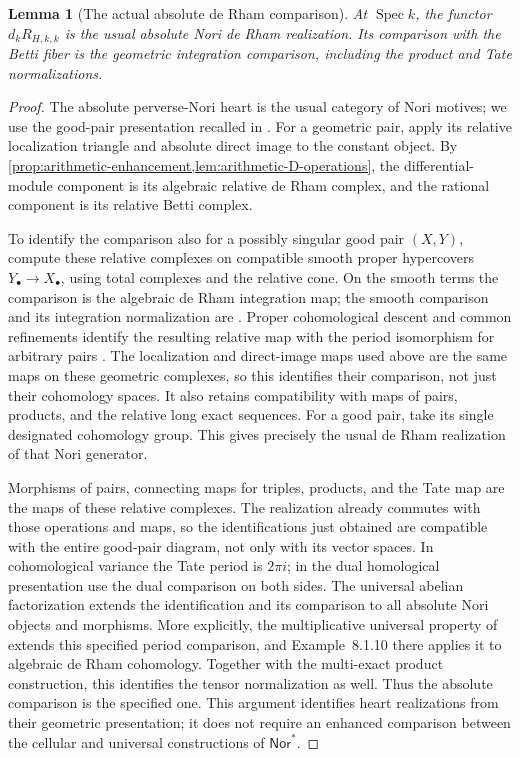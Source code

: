 \documentclass[11pt]{article}
\numberwithin{equation}{section}
\newtheorem{lemma}[lemma]{Lemma}
\theoremstyle{definition}
\theoremstyle{remark}
\newcommand{\Spec}{\operatorname{Spec}}
\begin{document}
\begin{lemma}[The actual absolute de Rham comparison]
\label{lem:absolute-dR-comparison}
At $\Spec k$, the functor $d_kR_{H,k,k}$ is the usual absolute Nori
de Rham realization. Its comparison with the Betti fiber is the
geometric integration comparison, including the product and Tate
normalizations.
\end{lemma}
\begin{proof}
The absolute perverse-Nori heart is the usual category of Nori motives;
we use the good-pair presentation recalled in
\cite[\S1.2]{Tubach}. For a geometric pair, apply its relative
localization triangle and absolute direct image to the constant object.
By \cref{prop:arithmetic-enhancement,lem:arithmetic-D-operations}, the
differential-module component is its algebraic relative de Rham complex,
and the rational component is its relative Betti complex.

To identify the comparison also for a possibly singular good pair
$(X,Y)$, compute these relative complexes on compatible smooth proper
hypercovers $Y_\bullet\to X_\bullet$, using total complexes and the
relative cone. On the smooth terms the comparison is the algebraic de
Rham integration map; the smooth comparison and its integration
normalization are \cite[Lemma~5.5.1 and Theorem~5.3.3]{HuberMullerStach}.
Proper cohomological descent and common refinements identify the
resulting relative map with the period isomorphism for arbitrary pairs
\cite[Definition~5.5.4 and Lemma~5.5.5]{HuberMullerStach}.
The localization and direct-image maps used above are the same maps on
these geometric complexes, so this identifies their comparison, not
just their cohomology spaces. It also retains compatibility with maps
of pairs, products, and the relative long exact sequences. For a good
pair, take its single designated cohomology group. This gives precisely
the usual de Rham realization of that Nori generator.

Morphisms of pairs, connecting maps for triples, products, and the Tate
map are the maps of these relative complexes. The realization already
commutes with those operations and maps, so the identifications just
obtained are compatible with the entire good-pair diagram, not only
with its vector spaces. In cohomological variance the Tate period is
$2\pi i$; in the dual homological presentation use the dual comparison
on both sides. The universal abelian factorization extends the
identification and its comparison to all absolute Nori objects and
morphisms. More explicitly, the multiplicative universal property of
\cite[Theorem~8.1.9]{HuberMullerStach} extends this specified period
comparison, and Example~8.1.10 there applies it to algebraic de Rham
cohomology. Together with the multi-exact product construction, this
identifies the tensor normalization as well. Thus the absolute
comparison is the specified one.
This argument identifies heart realizations from their geometric
presentation; it does not require an enhanced comparison between the
cellular and universal constructions of $\mathsf{Nor}^*$.
\end{proof}
\end{document}

